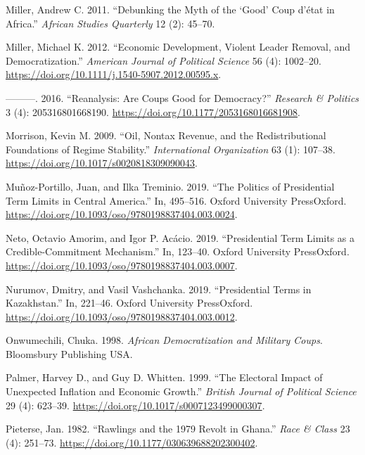 \documentclass[
  12pt,
]{report}
\newlength{\cslhangindent}
\newenvironment{CSLReferences}[2] %
 {\begin{list}{}{%
  \setlength{\itemindent}{0pt}
  \setlength{\leftmargin}{0pt}
  \setlength{\parsep}{0pt}
  \ifodd #1
   \setlength{\leftmargin}{\cslhangindent}
   \setlength{\itemindent}{-1\cslhangindent}
  \fi
  \setlength{\itemsep}{#2\baselineskip}}}
 {\end{list}}
\begin{document}
\begin{CSLReferences}{1}{0}
Miller, Andrew C. 2011. {``Debunking the Myth of the {`Good'} Coup
d'{é}tat in Africa.''} \emph{African Studies Quarterly} 12 (2): 45--70.

Miller, Michael K. 2012. {``Economic Development, Violent Leader
Removal, and Democratization.''} \emph{American Journal of Political
Science} 56 (4): 1002--20.
\url{https://doi.org/10.1111/j.1540-5907.2012.00595.x}.

---------. 2016. {``Reanalysis: Are Coups Good for Democracy?''}
\emph{Research \& Politics} 3 (4): 205316801668190.
\url{https://doi.org/10.1177/2053168016681908}.

Morrison, Kevin M. 2009. {``Oil, Nontax Revenue, and the
Redistributional Foundations of Regime Stability.''} \emph{International
Organization} 63 (1): 107--38.
\url{https://doi.org/10.1017/s0020818309090043}.

Muñoz-Portillo, Juan, and Ilka Treminio. 2019. {``The Politics of
Presidential Term Limits in Central America.''} In, 495--516. Oxford
University PressOxford.
\url{https://doi.org/10.1093/oso/9780198837404.003.0024}.

Neto, Octavio Amorim, and Igor P. Acácio. 2019. {``Presidential Term
Limits as a Credible-Commitment Mechanism.''} In, 123--40. Oxford
University PressOxford.
\url{https://doi.org/10.1093/oso/9780198837404.003.0007}.

Nurumov, Dmitry, and Vasil Vashchanka. 2019. {``Presidential Terms in
Kazakhstan.''} In, 221--46. Oxford University PressOxford.
\url{https://doi.org/10.1093/oso/9780198837404.003.0012}.

Onwumechili, Chuka. 1998. \emph{African Democratization and Military
Coups}. Bloomsbury Publishing USA.

Palmer, Harvey D., and Guy D. Whitten. 1999. {``The Electoral Impact of
Unexpected Inflation and Economic Growth.''} \emph{British Journal of
Political Science} 29 (4): 623--39.
\url{https://doi.org/10.1017/s0007123499000307}.

Pieterse, Jan. 1982. {``Rawlings and the 1979 Revolt in Ghana.''}
\emph{Race \& Class} 23 (4): 251--73.
\url{https://doi.org/10.1177/030639688202300402}.


\end{CSLReferences}
\end{document}
